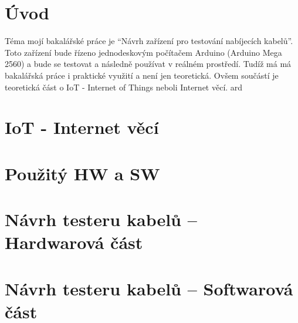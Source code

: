 \documentclass[12pt,a4paper,titlepage]{scrreprt}
\newcommand{\ardMeg}{Arduino Mega 2560}
\begin{document}
	
	
	
	\thispagestyle{empty}
	
	\thispagestyle{empty}
	
	\setcounter{page}{5}
	\printglossary
	\thispagestyle{empty}
	
	\listoffigures
	\thispagestyle{empty}
	\listoftables
	\thispagestyle{empty}

	\tableofcontents
	\thispagestyle{empty}

	
	\chapter{Úvod}
	Téma mojí bakalářské práce je “Návrh zařízení pro testování nabíjecích kabelů”. Toto zařízení bude řízeno jednodeskovým počítačem Arduino (\ardMeg) a bude se testovat a následně používat v reálném prostředí. Tudíž má má bakalářská práce i praktické využití a není jen teoretická. Ovšem součástí je teoretická část o IoT - Internet of Things neboli Internet věcí. \gls{ard}
	
	
	\chapter{IoT - Internet věcí}
	
	
	
	\chapter{Použitý HW a SW}
	
	
	
	
	\chapter{Návrh testeru kabelů – Hardwarová část}
	
	
	\chapter{Návrh testeru kabelů – Softwarová část}
	
	
\end{document}
